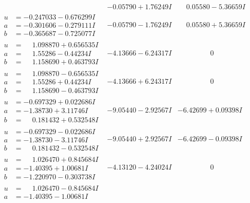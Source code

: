 \documentclass[1p]{elsarticle_modified}
\theoremstyle{definition}
\begin{document}
$$\begin{array}{c|c|c}
 & -0.05790 + 1.76249 I & \phantom{-}0.05580 - 5.36659 I \\ \hline\begin{aligned}
u &= -0.247033 - 0.676299 I \\
a &= -0.301606 - 0.279111 I \\
b &= -0.365687 - 0.725077 I\end{aligned}
 & -0.05790 - 1.76249 I & \phantom{-}0.05580 + 5.36659 I \\ \hline\begin{aligned}
u &= \phantom{-}1.098870 + 0.656535 I \\
a &= \phantom{-}1.55286 - 0.44234 I \\
b &= \phantom{-}1.158690 + 0.463793 I\end{aligned}
 & -4.13666 - 6.24317 I & \phantom{-0.000000 } 0 \\ \hline\begin{aligned}
u &= \phantom{-}1.098870 - 0.656535 I \\
a &= \phantom{-}1.55286 + 0.44234 I \\
b &= \phantom{-}1.158690 - 0.463793 I\end{aligned}
 & -4.13666 + 6.24317 I & \phantom{-0.000000 } 0 \\ \hline\begin{aligned}
u &= -0.697329 + 0.022686 I \\
a &= -1.38730 + 3.11746 I \\
b &= \phantom{-}0.181432 + 0.532548 I\end{aligned}
 & -9.05440 - 2.92567 I & -6.42699 + 0.09398 I \\ \hline\begin{aligned}
u &= -0.697329 - 0.022686 I \\
a &= -1.38730 - 3.11746 I \\
b &= \phantom{-}0.181432 - 0.532548 I\end{aligned}
 & -9.05440 + 2.92567 I & -6.42699 - 0.09398 I \\ \hline\begin{aligned}
u &= \phantom{-}1.026470 + 0.845684 I \\
a &= -1.40395 + 1.00681 I \\
b &= -1.220970 - 0.303738 I\end{aligned}
 & -4.13120 - 4.24024 I & \phantom{-0.000000 } 0 \\ \hline\begin{aligned}
u &= \phantom{-}1.026470 - 0.845684 I \\
a &= -1.40395 - 1.00681 I \\

\end{aligned}
\end{array}$$
\end{document}
